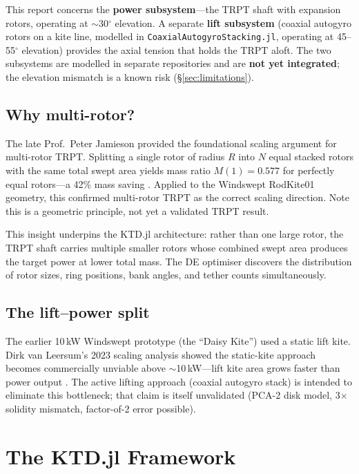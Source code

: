 \documentclass[11pt,a4paper]{article}
\begin{document}
This report concerns the \textbf{power subsystem}---the TRPT shaft with expansion rotors,
operating at $\sim$30$^\circ$ elevation.
A separate \textbf{lift subsystem} (coaxial autogyro rotors on a kite line, modelled in
\texttt{CoaxialAutogyroStacking.jl}, operating at 45--55$^\circ$ elevation) provides the
axial tension that holds the TRPT aloft.
The two subsystems are modelled in separate repositories and are \textbf{not yet integrated};
the elevation mismatch is a known risk (\S\ref{sec:limitations}).

\subsection{Why multi-rotor?}

The late Prof.\ Peter Jamieson provided the foundational scaling argument for multi-rotor TRPT.
Splitting a single rotor of radius $R$ into $N$ equal stacked rotors with the same total swept
area yields mass ratio $M(1) = 0.577$ for perfectly equal rotors---a 42\% mass saving \cite{jamieson2020}.
Applied to the Windswept RodKite01 geometry, this confirmed multi-rotor TRPT as the correct
scaling direction. Note this is a geometric principle, not yet a validated TRPT result.

This insight underpins the KTD.jl architecture: rather than one large rotor,
the TRPT shaft carries multiple smaller rotors whose combined swept area produces the target
power at lower total mass.
The DE optimiser discovers the distribution of rotor sizes, ring positions, bank angles,
and tether counts simultaneously.

\subsection{The lift--power split}

The earlier 10\,kW Windswept prototype (the ``Daisy Kite'') used a static lift kite.
Dirk van Leersum's 2023 scaling analysis showed the static-kite approach becomes commercially
unviable above $\sim$10\,kW---lift kite area grows faster than power output \cite{vanleersum2023}.
The active lifting approach (coaxial autogyro stack) is intended to eliminate this bottleneck;
that claim is itself unvalidated (PCA-2 disk model, 3$\times$ solidity mismatch,
factor-of-2 error possible).

\section{The KTD.jl Framework}
\end{document}
